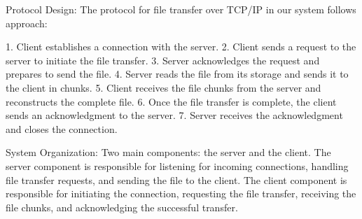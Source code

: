 Protocol Design:
The protocol for file transfer over TCP/IP in our system follows approach:

1. Client establishes a connection with the server.
2. Client sends a request to the server to initiate the file transfer.
3. Server acknowledges the request and prepares to send the file.
4. Server reads the file from its storage and sends it to the client in chunks.
5. Client receives the file chunks from the server and reconstructs the complete file.
6. Once the file transfer is complete, the client sends an acknowledgment to the server.
7. Server receives the acknowledgment and closes the connection.

System Organization:
Two main components: the server and the client. 
The server component is responsible for listening for incoming connections, handling file transfer requests, 
and sending the file to the client. 
The client component is responsible for initiating the connection, requesting the file transfer, 
receiving the file chunks, and acknowledging the successful transfer.